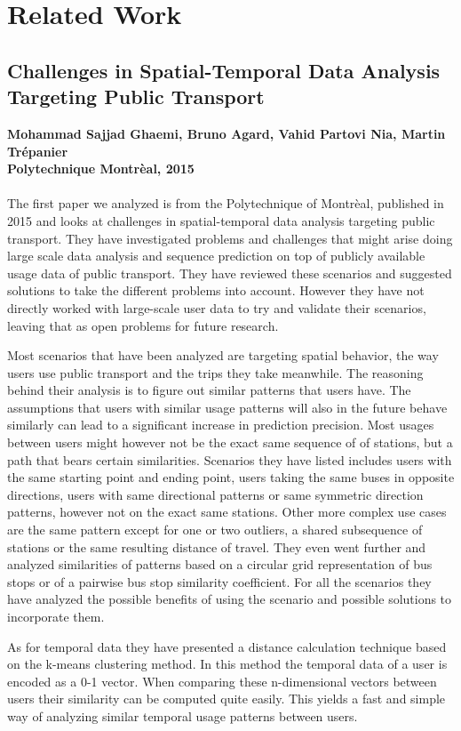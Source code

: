 \newpage
\section{Related Work}
\subsection{Challenges in Spatial-Temporal Data Analysis Targeting Public Transport}
\textbf{Mohammad Sajjad Ghaemi, Bruno Agard, Vahid Partovi Nia, Martin Trépanier\\
Polytechnique Montrèal, 2015}
\\
\\
The first paper we analyzed is from the Polytechnique of Montrèal, published in 2015 and looks at challenges in spatial-temporal data analysis targeting public transport. They have investigated problems and challenges that might arise doing large scale data analysis and sequence prediction on top of publicly available usage data of public transport. They have reviewed these scenarios and suggested solutions to take the different problems into account. However they have not directly worked with large-scale user data to try and validate their scenarios, leaving that as open problems for future research.

Most scenarios that have been analyzed are targeting spatial behavior, the way users use public transport and the trips they take meanwhile. The reasoning behind their analysis is to figure out similar patterns that users have. The assumptions that users with similar usage patterns will also in the future behave similarly can lead to a significant increase in prediction precision. Most usages between users might however not be the exact same sequence of of stations, but a path that bears certain similarities. Scenarios they have listed includes users with the same starting point and ending point, users taking the same buses in opposite directions, users with same directional patterns or same symmetric direction patterns, however not on the exact same stations. Other more complex use cases are the same pattern except for one or two outliers, a shared subsequence of stations or the same resulting distance of travel. They even went further and analyzed similarities of patterns based on a circular grid representation of bus stops or of a pairwise bus stop similarity coefficient. For all the scenarios they have analyzed the possible benefits of using the scenario and possible solutions to incorporate them.

As for temporal data they have presented a distance calculation technique based on the k-means clustering method. In this method the temporal data of a user is encoded as a 0-1 vector. When comparing these n-dimensional vectors between users their similarity can be computed quite easily. This yields a fast and simple way of analyzing similar temporal usage patterns between users.



